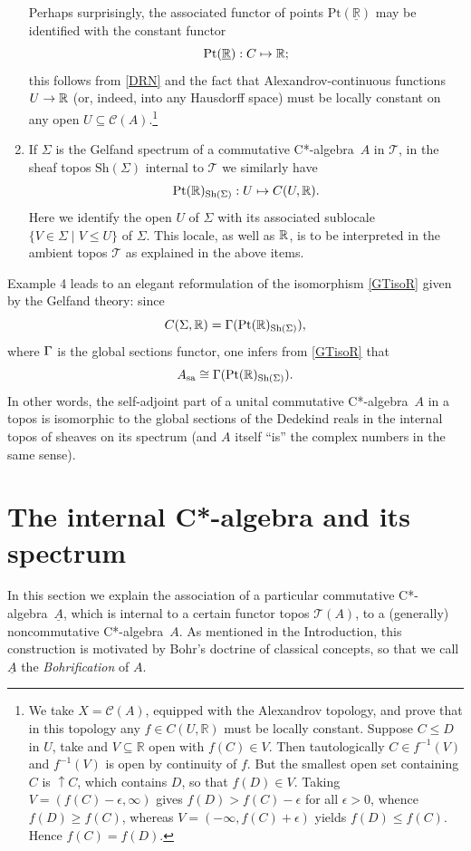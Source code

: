 \documentclass[12pt]{article}
\newcommand{\beq}{\begin{equation}}
\newcommand{\eeq}{\end{equation}}
\newcommand{\ca}{C*-algebra} \newcommand{\jba}{JB-algebra}
\newcommand{\raw}{\rightarrow} \newcommand{\rat}{\mapsto}
\newcommand{\inv}{^{-1}}
\newcommand{\er}{\eqref}
\newcommand{\ep}{\epsilon} \newcommand{\varep}{\varepsilon}
\newcommand{\Sg}{\Sigma} \newcommand{\ta}{\tau} \newcommand{\ph}{\phi}
\newcommand{\CA}{{\mathcal A}} \newcommand{\CB}{{\mathcal B}}
\newcommand{\CT}{{\mathcal T}} \newcommand{\CV}{{\mathcal V}}
\newcommand{\alg}[1]{\ensuremath{#1}}
\newcommand{\Sh}{\ensuremath{\mathrm{Sh}}}
\newcommand{\context}{\ensuremath{\mathcal{C}}}
\newcommand{\asstopos}{\ensuremath{\mathcal{T}}}
\newcommand{\sa}{\ensuremath{_{\mathrm{sa}}}}
\newcommand{\field}[1]{\ensuremath{\mathbb{#1}}}
\newcommand{\uA}{\underline{A}}
\renewcommand{\CA}{\mathcal{C}(A)}
\newcommand{\TA}{\mathcal{T}(A)}
\newcommand{\ulR}{\underline{\mathbb{R}}}
\renewcommand{\TA}{\asstopos(\alg{A})}
\renewcommand{\CA}{\context(\alg{A})}
\begin{document}
\begin{enumerate}
Perhaps surprisingly, the associated functor of points 
 $\mathrm{Pt}(\ulR)$ may be
    identified with the constant functor 
 \beq    
     \mathrm{Pt}(\ulR): C\mapsto \R;  \label{cf} \eeq
this follows from \er{DRN} and the fact that Alexandrov-continuous functions $U\raw\R$
(or, indeed, into any Hausdorff space) must be locally constant on any open $U\subseteq \CA$.\footnote{We take $X=\CA$,
equipped with the Alexandrov topology, and prove that in this topology
any $f \in C(U,\field{R})$ must be locally constant. 
 Suppose $C \leqslant D$ in $U$, take and $V \subseteq
\field{R}$ open with $f(C)\in V$. Then 
 tautologically $C\in f\inv (V)$ and $f\inv(V)$ is open  by continuity of $f$.
 But the smallest open set containing $C$ is $\uparrow\! C$, which contains $D$, so that
 $f(D)\in V$. 
 Taking $V=(f(C)-\ep,\infty)$ gives $f(D)> f(C)-\ep$ for all $\ep>0$, whence
$f(D)\geqslant f(C)$, whereas  $V=(-\infty,f(C)+\ep)$ yields $f(D)\leqslant f(C)$.
Hence $f(C)=f(D)$.}
  \item If $\Sg$ is the Gelfand spectrum of a commutative \ca\ ${A}$
    in $\CT$,  in the sheaf topos $\Sh(\Sg)$ internal to $\CT$  we
    similarly have
    \begin{equation}
      \mathrm{Pt}(\R)_{\Sh(\Sg)}:U\mapsto C(U,\R).\label{ShSg}
    \end{equation}
    Here we identify the open $U$ of $\Sg$ with its associated
    sublocale $\{V\in\Sg\mid V\leqslant U\}$ of $\Sg$. This locale, as well
    as ${\mathbb R}$, is to be interpreted in the
    ambient topos $\CT$ as explained in the above items.
\end{enumerate}


Example 4 leads to an elegant reformulation of
the isomorphism \er{GTisoR} given by the Gelfand theory: since
\beq C(\Sg,\R)=\Gm(\mathrm{Pt}(\R)_{\Sh(\Sg)}),\label{preelegant}\eeq where
$\Gamma$ is the global sections functor, one infers from \er{GTisoR} that
 \beq
 A\sa\cong \Gm(\mathrm{Pt}(\R)_{\Sh(\Sg)}).\label{elegant}\eeq
 In other words, the self-adjoint part of a unital commutative \ca\ $A$ in a
topos is
 isomorphic to the global sections of the Dedekind reals in the internal topos
of sheaves on its spectrum (and $A$ itself
 ``is'' the complex numbers in the same sense).
\section{The internal C*-algebra and its spectrum}
\label{sec:internalalgebra}
In this section we explain the association  of a particular commutative \ca\
$\uA$, which is
internal to a certain functor topos $\TA$, to a (generally) noncommutative \ca\
$A$.
As mentioned in the Introduction, this  construction is motivated by Bohr's
doctrine of classical concepts, so that we call $\uA$ the {\it Bohrification} of
$A$.
\end{document}
